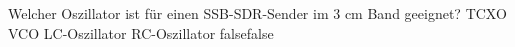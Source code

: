     {Welcher Oszillator ist für einen SSB-SDR-Sender im 3 cm Band geeignet?}
    {TCXO}
    {VCO}
    {LC-Oszillator}
    {RC-Oszillator}
    {false}{false}